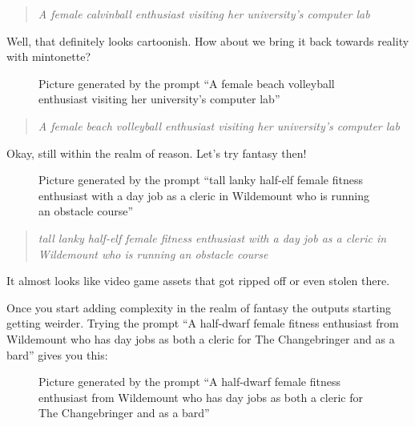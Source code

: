 \begin{quote}
\emph{A female calvinball enthusiast visiting her university's computer
lab}
\end{quote}

Well, that definitely looks cartoonish. How about we bring it back
towards reality with mintonette?

\begin{figure}
\centering
{}
\caption{Picture generated by the prompt ``A female beach volleyball
enthusiast visiting her university's computer lab''}
\end{figure}

\begin{quote}
\emph{A female beach volleyball enthusiast visiting her university's
computer lab}
\end{quote}

Okay, still within the realm of reason. Let's try fantasy then!

\begin{figure}
\centering
{}
\caption{Picture generated by the prompt ``tall lanky half-elf female
fitness enthusiast with a day job as a cleric in Wildemount who is
running an obstacle course''}
\end{figure}

\begin{quote}
\emph{tall lanky half-elf female fitness enthusiast with a day job as a
cleric in Wildemount who is running an obstacle course}
\end{quote}

It almost looks like video game assets that got ripped off or even
stolen there.

Once you start adding complexity in the realm of fantasy the outputs
starting getting weirder. Trying the prompt ``A half-dwarf female
fitness enthusiast from Wildemount who has day jobs as both a cleric for
The Changebringer and as a bard'' gives you this:

\begin{figure}
\centering
{}
\caption{Picture generated by the prompt ``A half-dwarf female fitness
enthusiast from Wildemount who has day jobs as both a cleric for The
Changebringer and as a bard''}
\end{figure}

